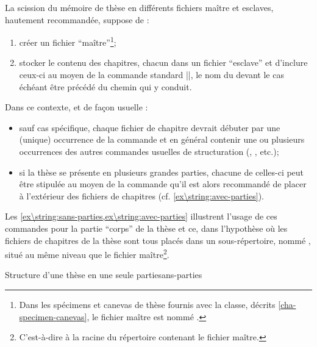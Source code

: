 La scission du mémoire de thèse en différents fichiers maître et esclaves,
hautement recommandée, suppose de :
\begin{enumerate}
\item créer un fichier \enquote{maître}\footnote{Dans les spécimens et canevas
    de thèse fournis avec la classe, décrits \vref{cha-specimen-canevas}, le
    fichier maître est nommé .};
\item stocker le contenu des chapitres, chacun dans un fichier
  \enquote{esclave}
  et d'inclure ceux-ci au moyen de la commande
  standard ||, le nom du  devant le cas échéant être précédé du chemin qui y
  conduit.
\end{enumerate}
%
Dans ce contexte, et de façon usuelle :
\begin{itemize}
\item sauf cas spécifique, chaque fichier de chapitre devrait débuter par une
  (unique) occurrence de la commande  et en général
  contenir une ou plusieurs occurrences des autres commandes usuelles de
  structuration (, , etc.);
\item si la thèse se présente en plusieurs grandes parties, chacune
  de celles-ci peut être stipulée au moyen de la commande
   qu'il est alors recommandé de placer à
  l'extérieur des fichiers de chapitres (cf.
  \vref{ex\string:avec-parties}).
\end{itemize}
%
Les \vref{ex\string:sans-parties,ex\string:avec-parties} illustrent l'usage de
ces commandes pour la partie \enquote{corps} de la thèse et ce, dans l'hypothèse
où les fichiers de chapitres de la thèse sont tous placés dans un
sous-répertoire, nommé , situé au même niveau que le fichier
maître\footnote{C'est-à-dire à la racine du répertoire contenant le fichier
  maître.}.
\begin{dbexample}{Structure d'une thèse en une seule partie}{sans-parties}
\begin{bodycode}
"}
"}
...
"}
"}
\end{bodycode}
\end{dbexample}
